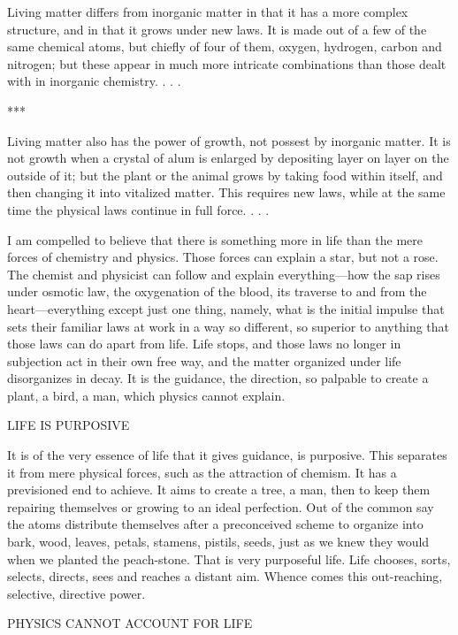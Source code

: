 Living matter differs from inorganic matter in that it has a more complex structure, and in
that it grows under new laws. It is made out of a few of the same chemical atoms, but chiefly
of four of them, oxygen, hydrogen, carbon and nitrogen; but these appear in much more
intricate combinations than those dealt with in inorganic chemistry. . . .

***

Living matter also has the power of growth, not possest by inorganic matter. It is not growth
when a crystal of alum is enlarged by depositing layer on layer on the outside of it; but the
plant or the animal grows by taking food within itself, and then changing it into vitalized
matter. This requires new laws, while at the same time the physical laws continue in full
force. . . .

I am compelled to believe that there is something more in life than the mere forces of
chemistry and physics. Those forces can explain a star, but not a rose. The chemist and
physicist can follow and explain everything—how the sap rises under osmotic law, the
oxygenation of the blood, its traverse to and from the heart—everything except just one
thing, namely, what is the initial impulse that sets their familiar laws at work in a way so
different, so superior to anything that those laws can do apart from life. Life stops, and those
laws no longer in subjection act in their own free way, and the matter organized under life
disorganizes in decay. It is the guidance, the direction, so palpable to create a plant, a bird, a
man, which physics cannot explain.

LIFE IS PURPOSIVE

It is of the very essence of life that it gives guidance, is purposive. This separates it from
mere physical forces, such as the attraction of chemism. It has a previsioned end to achieve.
It aims to create a tree, a man, then to keep them repairing themselves or growing to an ideal
perfection. Out of the common say the atoms distribute themselves after a preconceived
scheme to organize into bark, wood, leaves, petals, stamens, pistils, seeds, just as we knew
they would when we planted the peach-stone. That is very purposeful life. Life chooses,
sorts, selects, directs, sees and reaches a distant aim. Whence comes this out-reaching,
selective, directive power.

PHYSICS CANNOT ACCOUNT FOR LIFE

